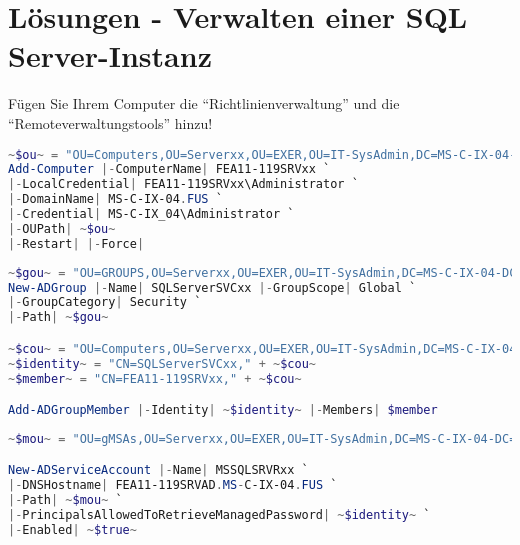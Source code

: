 \clearpage
    \section{Lösungen - Verwalten einer SQL Server-Instanz}
      \begin{enumerate}
          
          
          Fügen Sie Ihrem Computer die \enquote{Richtlinienverwaltung} und die
          \enquote{Remoteverwaltungstools} hinzu!
          
          
          \begin{lstlisting}[language=powershell, caption={Aufnehmen eines
          Computers in eine Windows Domäne}, label=admin_03_loesung_01]
~$ou~ = "OU=Computers,OU=Serverxx,OU=EXER,OU=IT-SysAdmin,DC=MS-C-IX-04-DC=FUS"
Add-Computer |-ComputerName| FEA11-119SRVxx `
|-LocalCredential| FEA11-119SRVxx\Administrator `
|-DomainName| MS-C-IX-04.FUS `
|-Credential| MS-C-IX_04\Administrator `
|-OUPath| ~$ou~
|-Restart| |-Force|
          \end{lstlisting}
          
          
\clearpage          
          
          
          
          \begin{lstlisting}[language=powershell, caption={Die notwendigen
          gMSAs erstellen}, label=admin_03_loesung_02]
~$gou~ = "OU=GROUPS,OU=Serverxx,OU=EXER,OU=IT-SysAdmin,DC=MS-C-IX-04-DC=FUS"
New-ADGroup |-Name| SQLServerSVCxx |-GroupScope| Global `
|-GroupCategory| Security `
|-Path| ~$gou~

~$cou~ = "OU=Computers,OU=Serverxx,OU=EXER,OU=IT-SysAdmin,DC=MS-C-IX-04-DC=FUS"
~$identity~ = "CN=SQLServerSVCxx," + ~$cou~
~$member~ = "CN=FEA11-119SRVxx," + ~$cou~

Add-ADGroupMember |-Identity| ~$identity~ |-Members| $member
          \end{lstlisting}
\clearpage
          \begin{lstlisting}[language=powershell]           
~$mou~ = "OU=gMSAs,OU=Serverxx,OU=EXER,OU=IT-SysAdmin,DC=MS-C-IX-04-DC=FUS"

New-ADServiceAccount |-Name| MSSQLSRVRxx `
|-DNSHostname| FEA11-119SRVAD.MS-C-IX-04.FUS `
|-Path| ~$mou~ `
|-PrincipalsAllowedToRetrieveManagedPassword| ~$identity~ `
|-Enabled| ~$true~


\end{lstlisting}
\end{enumerate}
